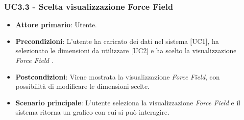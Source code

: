\subsubsection{UC3.3 - Scelta visualizzazione Force Field}
\begin{itemize}
	\item \textbf{Attore primario}: Utente.
	\item \textbf{Precondizioni}: L'utente ha caricato dei dati nel sistema [UC1], ha selezionato le dimensioni da utilizzare [UC2] e ha scelto la visualizzazione \textit{Force Field} .
	\item \textbf{Postcondizioni}: Viene mostrata la visualizzazione \textit{Force Field}, con possibilità di modificare le dimensioni scelte.
	\item \textbf{Scenario principale}: L'utente seleziona la visualizzazione \textit{Force Field} e il sistema ritorna un grafico con cui si può interagire.
\end{itemize}